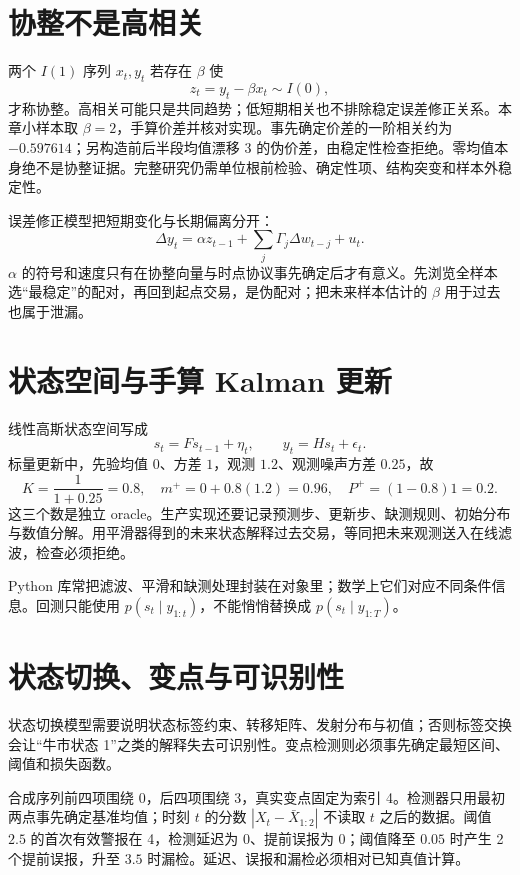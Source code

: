 \section{协整不是高相关}

两个 $I(1)$ 序列 $x_t,y_t$ 若存在 $\beta$ 使
\[
z_t=y_t-\beta x_t\sim I(0),
\]
才称协整。高相关可能只是共同趋势；低短期相关也不排除稳定误差修正关系。本章小样本取 $\beta=2$，手算价差并核对实现。事先确定价差的一阶相关约为 $-0.597614$；另构造前后半段均值漂移 3 的伪价差，由稳定性检查拒绝。零均值本身绝不是协整证据。完整研究仍需单位根前检验、确定性项、结构突变和样本外稳定性。

误差修正模型把短期变化与长期偏离分开：
\[
\Delta y_t=\alpha z_{t-1}+\sum_j\Gamma_j\Delta w_{t-j}+u_t.
\]
$\alpha$ 的符号和速度只有在协整向量与时点协议事先确定后才有意义。先浏览全样本选“最稳定”的配对，再回到起点交易，是伪配对；把未来样本估计的 $\beta$ 用于过去也属于泄漏。

\section{状态空间与手算 Kalman 更新}

线性高斯状态空间写成
\[
s_t=Fs_{t-1}+\eta_t,\qquad y_t=Hs_t+\epsilon_t.
\]
标量更新中，先验均值 $0$、方差 $1$，观测 $1.2$、观测噪声方差 $0.25$，故
\[
K=\frac{1}{1+0.25}=0.8,
\quad m^+=0+0.8(1.2)=0.96,
\quad P^+=(1-0.8)1=0.2.
\]
这三个数是独立 oracle。生产实现还要记录预测步、更新步、缺测规则、初始分布与数值分解。用平滑器得到的未来状态解释过去交易，等同把未来观测送入在线滤波，检查必须拒绝。

\begin{note}[Python 边界]
Python 库常把滤波、平滑和缺测处理封装在对象里；数学上它们对应不同条件信息。回测只能使用 $p(s_t\mid y_{1:t})$，不能悄悄替换成 $p(s_t\mid y_{1:T})$。
\end{note}

\section{状态切换、变点与可识别性}

状态切换模型需要说明状态标签约束、转移矩阵、发射分布与初值；否则标签交换会让“牛市状态 1”之类的解释失去可识别性。变点检测则必须事先确定最短区间、阈值和损失函数。

合成序列前四项围绕 0，后四项围绕 3，真实变点固定为索引 4。检测器只用最初两点事先确定基准均值；时刻 $t$ 的分数 $|X_t-\bar X_{1:2}|$ 不读取 $t$ 之后的数据。阈值 $2.5$ 的首次有效警报在 4，检测延迟为 0、提前误报为 0；阈值降至 $0.05$ 时产生 2 个提前误报，升至 $3.5$ 时漏检。延迟、误报和漏检必须相对已知真值计算。

